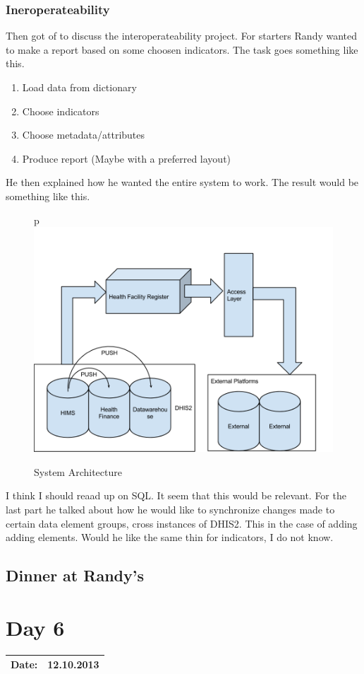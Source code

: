 \subsubsection{Ineroperateability}
Then got of to discuss the interoperateability project.
For starters Randy wanted to make a report based on some choosen indicators.
The task goes something like this.
\begin{enumerate}
\item Load data from dictionary
\item Choose indicators
\item Choose metadata/attributes
\item Produce report (Maybe with a preferred layout)
\end{enumerate}
He then explained how he wanted the entire system to work.
The result would be something like this.
\begin{figure}{p}
\centering
\includegraphics[width=15cm]{appendix/images/System_Architecture}
\caption{System Architecture}
\label{System Architecture}
\end{figure}
I think I should reaad up on SQL. It seem that this would be relevant.
For the last part he talked about how he would like to synchronize changes made to certain data element groups, cross instances of DHIS2. This in the case of adding adding elements. Would he like the same thin for indicators, I do not know. 
\subsection{Dinner at Randy's}
\section{Day 6}
\begin{tabular}{|c|c|}
\hline
Date: & 12.10.2013 \\
\hline
\end{tabular}
